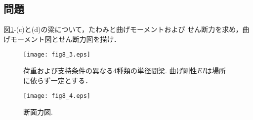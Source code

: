 \documentclass[10pt,a4j]{jbook}
\begin{document}
\subsection{問題}
図\ref{fig:fig8_3}-(c)と(d)の梁について，たわみと曲げモーメントおよび
せん断力を求め，曲げモーメント図とせん断力図を描け．
\begin{figure}
	\begin{center}
	\texttt{[image: fig8\_3.eps]} 
	\end{center}
	\caption{
		荷重および支持条件の異なる4種類の単径間梁.
		曲げ剛性$EI$は場所に依らず一定とする．
	 } 
	\label{fig:fig8_3}
\end{figure}
\begin{figure}
	\begin{center}
	\texttt{[image: fig8\_4.eps]} 
	\end{center}
	\caption{
		断面力図.
	 } 
	\label{fig:fig8_4}
\end{figure}
\end{document}
